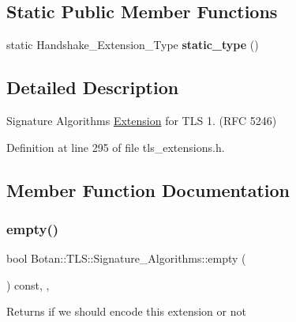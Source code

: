 \subsection*{Static Public Member Functions}
\begin{DoxyCompactItemize}
\item 
\mbox{\label{class_botan_1_1_t_l_s_1_1_signature___algorithms_a11ade2a28f47914ca39151db3c56875e}} 
static Handshake\+\_\+\+Extension\+\_\+\+Type {\bfseries static\+\_\+type} ()
\end{DoxyCompactItemize}


\subsection{Detailed Description}
Signature Algorithms \mbox{\hyperlink{class_botan_1_1_t_l_s_1_1_extension}{Extension}} for T\+LS 1. (R\+FC 5246) 

Definition at line 295 of file tls\+\_\+extensions.\+h.



\subsection{Member Function Documentation}
\mbox{\label{class_botan_1_1_t_l_s_1_1_signature___algorithms_a7216e44527a194bebce7d616d6d3fe62}} 
\subsubsection{\texorpdfstring{empty()}{empty()}}
{\footnotesize\ttfamily bool Botan\+::\+T\+L\+S\+::\+Signature\+\_\+\+Algorithms\+::empty (\begin{DoxyParamCaption}{ }\end{DoxyParamCaption}) const\hspace{0.3cm}{\ttfamily [inline]}, {\ttfamily [override]}, {\ttfamily [virtual]}}

\begin{DoxyReturn}{Returns}
if we should encode this extension or not 
\end{DoxyReturn}


